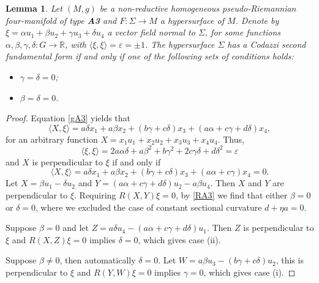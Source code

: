 \documentclass{amsart}
\theoremstyle{plain}
\newtheorem{lemma}{Lemma}
\theoremstyle{remark}
\def\R{\mathbb{R}}
\begin{document}
{\begin{lemma} \label{necA3}
Let $(M,g)$ be a non-reductive homogeneous pseudo-Riemannian four-manifold of type {\rm\bf A3} and $F : \Sigma \to M$ a hypersurface of $M$. Denote by $\xi=\alpha u_1+\beta u_2+\gamma u_3+\delta u_4$ a vector field normal to $\Sigma$, for some functions $\alpha, \beta, \gamma, \delta : G \to \R$, with $\langle \xi,\xi \rangle =\varepsilon=\pm 1$. The hypersurface $\Sigma$ has a Codazzi second fundamental form if and only if one of the following sets of conditions holds: 
%
\begin{itemize}
\item[(i)] $\gamma=\delta =0$;
\item[(ii)] $\beta=\delta=0$.
\end{itemize}
\end{lemma}
\begin{proof} Equation \eqref{gA3} yields that  
%
\[\langle X,\xi\rangle=a\delta x_1+a \beta x_2+(b\gamma +c\delta)x_3+(a\alpha +c\gamma+d\delta) x_4,\]
%
for an arbitrary function $X=x_1u_1+x_2u_2+x_3u_3+x_4u_4$. Thus, 
%
\begin{equation}\label{nxiA3}
\langle \xi,\xi\rangle=2a \alpha\delta +a\beta^ 2+b\gamma ^2 +2c\gamma \delta +d\delta^2 = \varepsilon
\end{equation}
%
and $X$ is perpendicular to $\xi$ if and only if 
%
\[%
\langle X,\xi\rangle=a\delta x_1+a \beta x_2+(b\gamma +c\delta)x_3+(a\alpha +c\gamma) x_4=0.
\]
%
Let $X=\beta u_1 - \delta u_2$ and $Y=(a\alpha + c\gamma + d\delta)u_2 - a\beta u_4$. Then $X$ and $Y$ are perpendicular to $\xi$. Requiring $R(X,Y)\xi=0$, by \eqref{RA3} we find that either $\beta=0$ or $\delta=0$, where we excluded the case of constant sectional curvature $d+\eta a  = 0$.

Suppose $\beta =0$ and let $Z = a\delta u_4 - (a\alpha+c\gamma+d\delta)u_1$. Then $Z$ is perpendicular to $\xi$ and $R(X,Z)\xi = 0$ implies $\delta = 0$, which gives case (ii).

Suppose $\beta \neq 0$, then automatically $\delta = 0$. Let $W = a\beta u_3- (b\gamma+c\delta)u_2$, this is perpendicular to $\xi$ and $R(Y,W)\xi = 0$ implies $\gamma = 0$, which gives case (i). 


\end{proof}}
\end{document}
